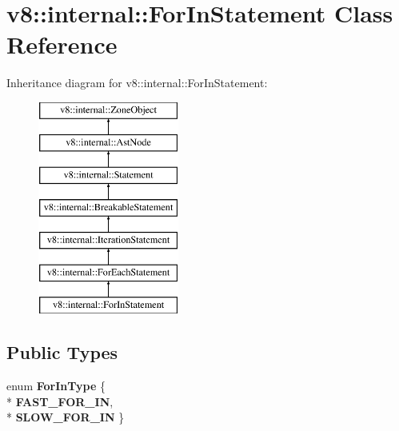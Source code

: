 \hypertarget{classv8_1_1internal_1_1_for_in_statement}{}\section{v8\+:\+:internal\+:\+:For\+In\+Statement Class Reference}
\label{classv8_1_1internal_1_1_for_in_statement}
Inheritance diagram for v8\+:\+:internal\+:\+:For\+In\+Statement\+:\begin{figure}[H]
\begin{center}
\leavevmode
\includegraphics[height=7.000000cm]{classv8_1_1internal_1_1_for_in_statement}
\end{center}
\end{figure}
\subsection*{Public Types}
\begin{DoxyCompactItemize}
\item 
enum {\bfseries For\+In\+Type} \{ \\*
{\bfseries F\+A\+S\+T\+\_\+\+F\+O\+R\+\_\+\+IN}, 
\\*
{\bfseries S\+L\+O\+W\+\_\+\+F\+O\+R\+\_\+\+IN}
 \}\hypertarget{classv8_1_1internal_1_1_for_in_statement_a07ec4df87c6954017f3aa27f6aa328d2}{}\label{classv8_1_1internal_1_1_for_in_statement_a07ec4df87c6954017f3aa27f6aa328d2}

\end{DoxyCompactItemize}
